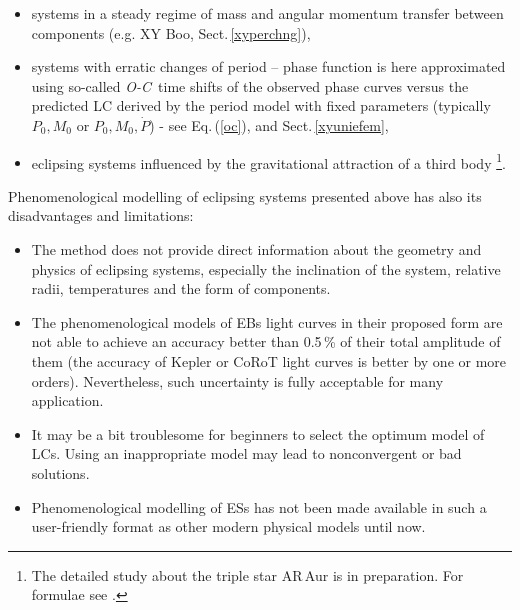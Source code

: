 \documentclass{aa}
\newcommand{\oc}{\textit{O-C}}
\begin{document}
\begin{enumerate}
\begin{itemize}
    \item systems in a steady regime of mass and angular momentum transfer between components (e.g. XY Boo, Sect.\,\ref{xyperchng}),

    \item systems with erratic changes of period -- phase function is here approximated using so-called \oc\ time shifts of the observed phase curves versus the predicted LC derived by the period model with fixed parameters (typically $P_0,M_0$ or $P_0,M_0,\dot{P}$) - see Eq.\,(\ref{oc}), and Sect.\,\ref{xyuniefem},

    \item eclipsing systems influenced by the gravitational attraction of a third body \citep[see the preliminary paper about AR\,Aur in][and the discussion in Wilson \& VanHamme 2014]{mikar}\footnote{The detailed study about the triple star AR\,Aur is in preparation. For formulae see \citet{liska}.}.
    \end{itemize}

\end{enumerate}



\noindent Phenomenological modelling of eclipsing systems presented above has also its disadvantages and limitations:
\begin{itemize}
\item[$\bullet$] The method does not provide direct information about the geometry and physics of eclipsing systems, especially the inclination of the system, relative radii, temperatures and the form of components.
\item[$\bullet$] The phenomenological models of EBs light curves in their proposed form are not able to achieve an accuracy better than 0.5\,\% of their total amplitude of them (the accuracy of Kepler or CoRoT light curves is better by one or more orders). Nevertheless, such uncertainty is fully acceptable for many application.
\item[$\bullet$] It may be a bit troublesome for beginners to select the optimum model of LCs. Using an inappropriate model may lead to nonconvergent or bad solutions.
\item[$\bullet$] Phenomenological modelling of ESs has not been made available in such a user-friendly format as other modern physical models \citep[e.\,g.][]{had,prsa08,prsa11,wilson} until now.
\end{itemize}
\end{document}
